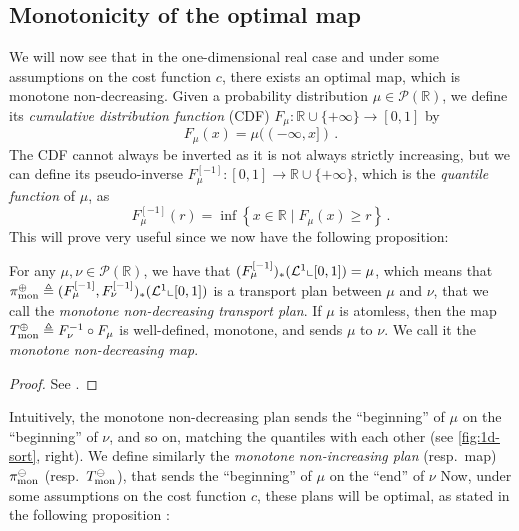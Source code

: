     \subsection{Monotonicity of the optimal map}
    \label{sec:monotonicity}
        We will now see that in the one-dimensional real case and under some assumptions on the cost function $c$, there exists an optimal map, which is monotone non-decreasing. Given a probability distribution $\mu \in\mathcal{P}(\mathbb{R})$, we define its \emph{cumulative distribution function} (CDF) $F_{\mu}:\mathbb{R}\cup \{ +\infty \}\to[0,1]$ by
        \begin{equation*}
            F_{\mu}(x)=\mu((-\infty,x])\,.
        \end{equation*}
        The CDF cannot always be inverted as it is not always strictly increasing, but we can define its pseudo-inverse $F_{\mu}^{[-1]}:[0,1]\to \mathbb{R}\cup \{ +\infty \}$, which is the \emph{quantile function} of $\mu$, as
        \begin{equation*}
            F_{\mu}^{[-1]}(r)=\inf\left\{ x \in \mathbb{R}\mid F_{\mu}(x)\geq r \right\}  \,.
        \end{equation*}
        This will prove very useful since we now have the following proposition:
        \begin{proposition}
            \label{def:monotone}
            For any $\mu,\nu \in\mathcal{P}(\mathbb{R})$, we have that $(F_{\mu}^{[-1]})_*(\mathcal{L}^1\llcorner [0,1])=\mu$, which means that $\pi_\text{mon}^\oplus\triangleq(F_{\mu}^{[-1]},F_{\nu}^{[-1]})_*(\mathcal{L}^1\llcorner[0,1])$ is a transport plan between $\mu$ and $\nu$, that we call the \emph{monotone non-decreasing transport plan}. If $\mu$ is atomless, then the map $T_\text{mon}^\oplus\triangleq F_{\nu}^{-1}\circ F_{\mu}$ is well-defined, monotone, and sends $\mu$ to $\nu$. We call it the \emph{monotone non-decreasing map}.
        \end{proposition}
        \begin{proof}
            See \cite[Sec.~2.1]{santambrogio2015optimal}.
        \end{proof}
        Intuitively, the monotone non-decreasing plan sends the ``beginning'' of $\mu$ on the ``beginning'' of $\nu$, and so on, matching the quantiles with each other (see \cref{fig:1d-sort}, right).
        We define similarly the \emph{monotone non-increasing plan} (resp.~map) $\pi_\text{mon}^\ominus$ (resp.~$T_\text{mon}^\ominus$), that sends the ``beginning'' of $\mu$ on the ``end'' of $\nu$
        Now, under some assumptions on the cost function $c$, these plans will be optimal, as stated in the following proposition \cite{carlier2008remarks,santambrogio2015optimal}:
